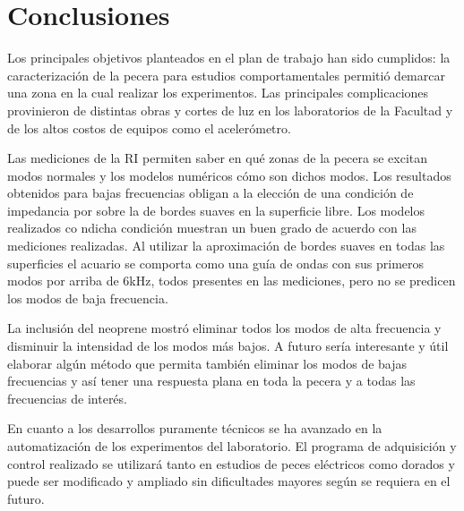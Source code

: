 \chapter{Conclusiones}

Los principales objetivos planteados en el plan de trabajo han sido cumplidos: la caracterización de la pecera para estudios comportamentales permitió demarcar una zona en la cual realizar los experimentos. Las principales complicaciones provinieron de distintas obras y cortes de luz en los laboratorios de la Facultad y de los altos costos de equipos como el acelerómetro.

Las mediciones de la RI permiten saber en qué zonas de la pecera se excitan modos normales y los modelos numéricos cómo son dichos modos. Los resultados obtenidos para bajas frecuencias obligan a la elección de una condición de impedancia por sobre la de bordes suaves en la superficie libre. Los modelos realizados co ndicha condición muestran un buen grado de acuerdo con las mediciones realizadas. Al utilizar la aproximación de bordes suaves en todas las superficies el acuario se comporta como una guía de ondas con sus primeros modos por arriba de 6kHz, todos presentes en las mediciones, pero no se predicen los modos de baja frecuencia.

La inclusión del neoprene mostró eliminar todos los modos de alta frecuencia y disminuir la intensidad de los modos más bajos. A futuro sería interesante y útil elaborar algún método que permita también eliminar los modos de bajas frecuencias y así tener una respuesta plana en toda la pecera y a todas las frecuencias de interés.

En cuanto a los desarrollos puramente técnicos se ha avanzado en la automatización de los experimentos del laboratorio. El programa de adquisición y control realizado se utilizará tanto en estudios de peces eléctricos como dorados y puede ser modificado y ampliado sin dificultades mayores según se requiera en el futuro.